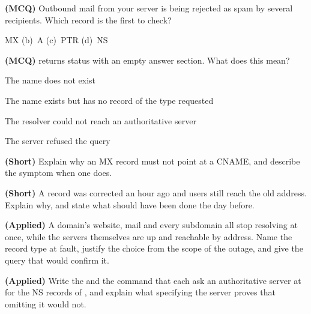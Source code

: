 \begin{reviewq}
  \item \textbf{(MCQ)} Outbound mail from your server is being rejected as spam by
        several recipients. Which record is the first to check?
        \begin{tight}
          \item[(a)] MX \quad (b)~A \quad (c)~PTR \quad (d)~NS
        \end{tight}
  \item \textbf{(MCQ)}  returns status  with an empty answer
        section. What does this mean?
        \begin{tight}
          \item[(a)] The name does not exist
          \item[(b)] The name exists but has no record of the type requested
          \item[(c)] The resolver could not reach an authoritative server
          \item[(d)] The server refused the query
        \end{tight}
  \item \textbf{(Short)} Explain why an MX record must not point at a CNAME, and
        describe the symptom when one does.
  \item \textbf{(Short)} A record was corrected an hour ago and users still reach
        the old address. Explain why, and state what should have been done the day
        before.
  \item \textbf{(Applied)} A domain's website, mail and every subdomain all stop
        resolving at once, while the servers themselves are up and reachable by
        address. Name the record type at fault, justify the choice from the scope
        of the outage, and give the query that would confirm it.
  \item \textbf{(Applied)} Write the  and the  command that
        each ask an authoritative server at  for the NS records of
        , and explain what specifying the server proves that
        omitting it would not.
\end{reviewq}
